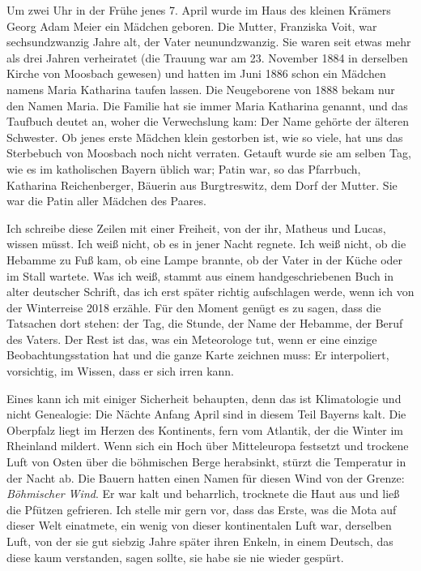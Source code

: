 \documentclass[
  ngerman,
  11pt,
  openany]{book}
\begin{document}
Um zwei Uhr in der Frühe jenes 7. April wurde im Haus des kleinen
Krämers Georg Adam Meier ein Mädchen geboren. Die Mutter, Franziska
Voit, war sechsundzwanzig Jahre alt, der Vater neunundzwanzig. Sie waren
seit etwas mehr als drei Jahren verheiratet (die Trauung war am 23.
November 1884 in derselben Kirche von Moosbach gewesen) und hatten im
Juni 1886 schon ein Mädchen namens Maria Katharina taufen lassen. Die
Neugeborene von 1888 bekam nur den Namen Maria. Die Familie hat sie
immer Maria Katharina genannt, und das Taufbuch deutet an, woher die
Verwechslung kam: Der Name gehörte der älteren Schwester. Ob jenes erste
Mädchen klein gestorben ist, wie so viele, hat uns das Sterbebuch von
Moosbach noch nicht verraten. Getauft wurde sie am selben Tag, wie es im
katholischen Bayern üblich war; Patin war, so das Pfarrbuch, Katharina
Reichenberger, Bäuerin aus Burgtreswitz, dem Dorf der Mutter. Sie war
die Patin aller Mädchen des Paares.

Ich schreibe diese Zeilen mit einer Freiheit, von der ihr, Matheus und
Lucas, wissen müsst. Ich weiß nicht, ob es in jener Nacht regnete. Ich
weiß nicht, ob die Hebamme zu Fuß kam, ob eine Lampe brannte, ob der
Vater in der Küche oder im Stall wartete. Was ich weiß, stammt aus einem
handgeschriebenen Buch in alter deutscher Schrift, das ich erst später
richtig aufschlagen werde, wenn ich von der Winterreise 2018 erzähle.
Für den Moment genügt es zu sagen, dass die Tatsachen dort stehen: der
Tag, die Stunde, der Name der Hebamme, der Beruf des Vaters. Der Rest
ist das, was ein Meteorologe tut, wenn er eine einzige
Beobachtungsstation hat und die ganze Karte zeichnen muss: Er
interpoliert, vorsichtig, im Wissen, dass er sich irren kann.

Eines kann ich mit einiger Sicherheit behaupten, denn das ist
Klimatologie und nicht Genealogie: Die Nächte Anfang April sind in
diesem Teil Bayerns kalt. Die Oberpfalz liegt im Herzen des Kontinents,
fern vom Atlantik, der die Winter im Rheinland mildert. Wenn sich ein
Hoch über Mitteleuropa festsetzt und trockene Luft von Osten über die
böhmischen Berge herabsinkt, stürzt die Temperatur in der Nacht ab. Die
Bauern hatten einen Namen für diesen Wind von der Grenze:
\emph{Böhmischer Wind}. Er war kalt und beharrlich, trocknete die Haut
aus und ließ die Pfützen gefrieren. Ich stelle mir gern vor, dass das
Erste, was die Mota auf dieser Welt einatmete, ein wenig von dieser
kontinentalen Luft war, derselben Luft, von der sie gut siebzig Jahre
später ihren Enkeln, in einem Deutsch, das diese kaum verstanden, sagen
sollte, sie habe sie nie wieder gespürt.
\end{document}
